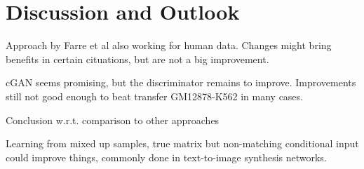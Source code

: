 \section{Discussion and Outlook}
Approach by Farre et al also working for human data.
Changes might bring benefits in certain cituations, but are not a big improvement.

cGAN seems promising, but the discriminator remains to improve.
Improvements still not good enough to beat transfer GM12878-K562 in many cases.

Conclusion w.r.t. comparison to other approaches

Learning from mixed up samples, true matrix but non-matching conditional input could improve things,
commonly done in text-to-image synthesis networks.
